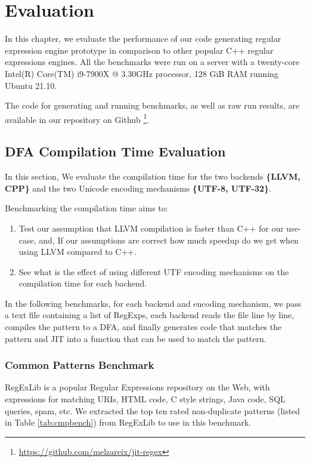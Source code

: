 \chapter{Evaluation}\label{chapter:evaluation}
In this chapter, we evaluate the performance of our code generating regular expression engine prototype in comparison to other popular C++ regular expressions engines. All the benchmarks were run on a server with a twenty-core Intel(R) Core(TM) i9-7900X @ 3.30GHz processor, 128 GiB RAM running Ubuntu 21.10.

The code for generating and running benchmarks, as well as raw run results, are available in our repository on Github \footnote{\url{https://github.com/melzareix/jit-regex}}.

\newcommand\rownumberone{\stepcounter{magicrownumbers1}\arabic{magicrownumbers1}}
\newcommand\rownumbertwo{\stepcounter{magicrownumbers2}\arabic{magicrownumbers2}}
\newcommand\rownumberthree{\stepcounter{magicrownumbers3}\arabic{magicrownumbers3}}

\section{DFA Compilation Time Evaluation}
In this section, We evaluate the compilation time for the two backends \textbf{\{LLVM, CPP\}} and the two Unicode encoding mechanisms \textbf{\{UTF-8, UTF-32\}}.

Benchmarking the compilation time aims to:
\begin{enumerate}
    \item Test our assumption that LLVM compilation is faster than C++ for our use-case, and, If our assumptions are correct how much speedup do we get when using LLVM compared to C++.
    
    \item See what is the effect of using different UTF encoding mechanisms on the compilation time for each backend.
\end{enumerate}

In the following benchmarks, for each backend and encoding mechanism, we pass a text file containing a list of RegExps, each backend reads the file line by line, compiles the pattern to a DFA, and finally generates code that matches the pattern and JIT into a function that can be used to match the pattern.

\subsection{Common Patterns Benchmark}\label{cmnpatt}
RegExLib \cite{regexlib} is a popular Regular Expressions repository on the Web, with expressions for matching URIs, HTML code, C style strings, Java code, SQL queries, spam, etc. We extracted the top ten rated non-duplicate patterns (listed in Table \ref{tab:cmpbench}) from RegExLib to use in this benchmark.


